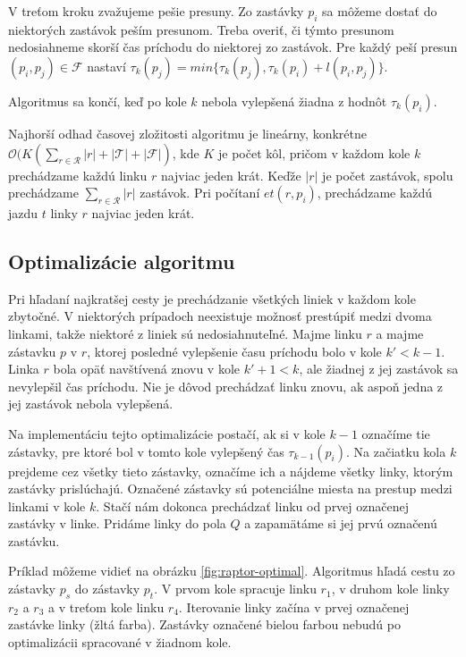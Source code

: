 V treťom kroku zvažujeme pešie presuny. Zo zastávky $p_i$ sa môžeme dostať do niektorých zastávok peším presunom. Treba overiť, či týmto presunom nedosiahneme skorší čas príchodu do niektorej zo zastávok. Pre každý peší presun $(p_i, p_j) \in \mathcal{F}$ nastaví $\tau_k(p_j) = min\{\tau_k(p_j), \tau_k(p_i) + l(p_i, p_j)\}$. 

Algoritmus sa končí, keď po kole $k$ nebola vylepšená žiadna z hodnôt $\tau_k(p_i)$. 

Najhorší odhad časovej zložitosti algoritmu je lineárny, konkrétne $\mathcal{O}(K(\sum_{r \in \mathcal{R}} |r| + |\mathcal{T}| + |\mathcal{F}|)$, kde $K$ je počet kôl, pričom v každom kole $k$ prechádzame každú linku $r$ najviac jeden krát. Keďže $|r|$ je počet zastávok, spolu prechádzame $\sum_{r \in \mathcal{R}} |r|$ zastávok. Pri počítaní $et(r, p_i)$, prechádzame každú jazdu $t$ linky $r$ najviac jeden krát. 

\subsection{Optimalizácie algoritmu}
Pri hľadaní najkratšej cesty je prechádzanie všetkých liniek v každom kole zbytočné. V niektorých prípadoch neexistuje možnosť prestúpiť medzi dvoma linkami, takže niektoré z liniek sú nedosiahnuteľné. Majme linku $r$ a majme zástavku $p$ v $r$, ktorej posledné vylepšenie času príchodu bolo v kole $k' < k-1$. Linka $r$ bola opäť navštívená znovu v kole $k'+1 < k$, ale žiadnej z jej zastávok sa nevylepšil čas príchodu. Nie je dôvod prechádzať linku znovu, ak aspoň jedna z jej zastávok nebola vylepšená. 

Na implementáciu tejto optimalizácie postačí, ak si v kole $k-1$ označíme tie zástavky, pre ktoré bol v tomto kole vylepšený čas $\tau_{k-1}(p_i)$. Na začiatku kola $k$ prejdeme cez všetky tieto zástavky, označíme ich a nájdeme všetky linky, ktorým zastávky prislúchajú. Označené zástavky sú potenciálne miesta na prestup medzi linkami v kole $k$. Stačí nám dokonca prechádzať linku od prvej označenej zastávky v linke. Pridáme linky do pola $Q$ a zapamätáme si jej prvú označenú zastávku. 

Príklad môžeme vidieť na obrázku \ref{fig:raptor-optimal}. Algoritmus hľadá cestu zo zástavky $p_s$ do zástavky $p_t$. V prvom kole spracuje linku $r_1$, v druhom kole linky $r_2$ a $r_3$ a v treťom kole linku $r_4$. Iterovanie linky začína v prvej označenej zastávke linky (žltá farba). Zastávky označené bielou farbou nebudú po optimalizácii spracované v žiadnom kole. 

